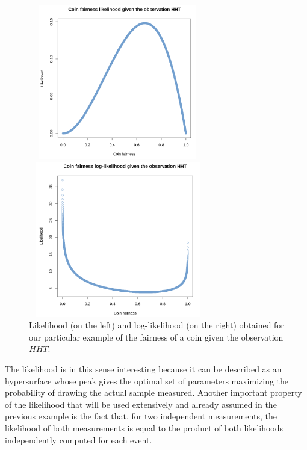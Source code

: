 \documentclass[a4paper, 11pt, twoside, openright]{report}
\begin{document}
\begin{figure}[htbp]
\centering
\begin{minipage}[b]{.49\textwidth}
\includegraphics[width=7.8cm, height=6.8cm]{figs/likelihood.png}
\end{minipage}\hfill
\begin{minipage}[b]{.49\textwidth}
\includegraphics[width=7.8cm, height=6.8cm]{figs/loglikelihood.png}
\end{minipage} \hfill
\caption{Likelihood (on the left) and log-likelihood (on the right) obtained for our particular example of the fairness of a coin given the observation $HHT$.}
\label{fig:likelihoodEx}
\end{figure}

The likelihood is in this sense interesting because it can be described as an hypersurface whose peak gives the optimal set of parameters maximizing the probability of drawing the actual sample measured. Another important property of the likelihood that will be used extensively and already assumed in the previous example is the fact that, for two independent measurements, the likelihood of both measurements is equal to the product of both likelihoods independently computed for each event.
\end{document}

